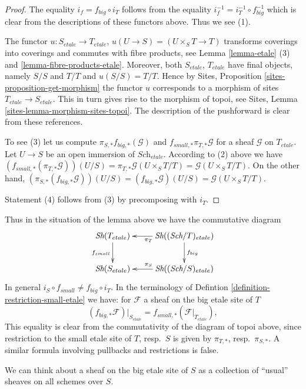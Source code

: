 \begin{proof}
The equality $i_f = f_{big} \circ i_T$ follows from the
equality $i_f^{-1} = i_T^{-1} \circ f_{big}^{-1}$ which is
clear from the descriptions of these functors above.
Thus we see (1).

\medskip\noindent
The functor $u : S_{etale} \to T_{etale}$, $u(U \to S) = (U \times_S T \to T)$
transforms coverings into coverings and commutes with fibre products,
see Lemma \ref{lemma-etale} (3) and \ref{lemma-fibre-products-etale}.
Moreover, both $S_{etale}$, $T_{etale}$ have final objects, namely
$S/S$ and $T/T$ and $u(S/S) = T/T$. Hence by
Sites, Proposition \ref{sites-proposition-get-morphism}
the functor $u$ corresponds to a morphism of sites
$T_{etale} \to S_{etale}$. This in turn gives rise to the morphism
of topoi, see
Sites, Lemma \ref{sites-lemma-morphism-sites-topoi}. The description
of the pushforward is clear from these references.

\medskip\noindent
To see (3) let us compute $\pi_{S, *}f_{big, *}(\mathcal{G})$ and
$f_{small, *} \pi_{T, *}\mathcal{G}$ for a sheaf $\mathcal{G}$ on
$T_{etale}$. Let $U \to S$ be an open
immersion of $\textit{Sch}_{etale}$. According to
(2) above we have $(f_{small, *}(\pi_{T, *}\mathcal{G}))(U/S) =
\pi_{T, *}\mathcal{G}(U \times_S T/T) = \mathcal{G}(U\times_S T/T)$.
On the other hand,
$(\pi_{S, *}(f_{big, *}\mathcal{G}))(U/S) =
(f_{big, *}\mathcal{G})(U/S) =
\mathcal{G}(U\times_S T/T)$.

\medskip\noindent
Statement (4) follows from (3) by precomposing with $i_T$.
\end{proof}

\noindent
Thus in the situation of the lemma above we have the commutative diagram
$$
\xymatrix{
\textit{Sh}(T_{etale}) \ar[d]_{f_{small}} &
\textit{Sh}((\textit{Sch}/T)_{etale}) \ar[d]^{f_{big}} \ar[l]^{\pi_T}\\
\textit{Sh}(S_{etale}) &
\textit{Sh}((\textit{Sch}/S)_{etale}) \ar[l]_{\pi_S}
}
$$
In general $i_S \circ f_{small} \not = f_{big} \circ i_T$.
In the terminology of
Defintion \ref{definition-restriction-small-etale}
we have: for $\mathcal{F}$ a sheaf on the big etale site of $T$
$$
(f_{big, *}\mathcal{F})|_{S_{etale}} =
f_{small, *}(\mathcal{F}|_{T_{etale}}),
$$
This equality is clear from the commutativity of the diagram of
topoi above, since restriction to the small etale site of $T$, resp.\ $S$
is given by $\pi_{T, *}$, resp.\ $\pi_{S, *}$. A similar formula involving
pullbacks and restrictions is false.

\medskip\noindent
We can think about a sheaf on the big etale site of $S$ as a collection
of ``usual'' sheaves on all schemes over $S$.

